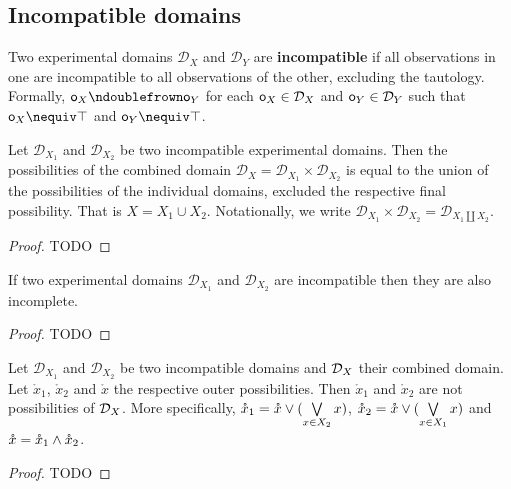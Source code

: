 \documentclass[11pt,letterpaper,fleqn]{memoir} %
\begin{document}
\subsection{Incompatible domains}

\begin{mathSection}
	\begin{defn}
		Two experimental domains $\mathcal{D}_X$ and $\mathcal{D}_Y$ are \textbf{incompatible} if all observations in one are incompatible to all observations of the other, excluding the tautology. Formally, $\obs_X \ncomp \obs_Y$ for each $\mathsf{o}_X \in \mathcal{D}_X$ and $\mathsf{o}_Y \in \mathcal{D}_Y$ such that $\obs_X \nequiv \tautology $ and $\obs_Y \nequiv \tautology$.
	\end{defn}
	\begin{prop}
		Let $\mathcal{D}_{X_1}$ and $\mathcal{D}_{X_2}$ be two incompatible experimental domains. Then the possibilities of the combined domain $\mathcal{D}_X = \mathcal{D}_{X_1} \times \mathcal{D}_{X_2}$ is equal to the union of the possibilities of the individual domains, excluded the respective final possibility. That is $X = X_1 \cup X_2$. Notationally, we write $\mathcal{D}_{X_1} \times \mathcal{D}_{X_2} = \mathcal{D}_{X_1 \coprod X_2}$.
	\end{prop}
	\begin{proof}
		TODO
	\end{proof}
	\begin{prop}
		If two experimental domains $\mathcal{D}_{X_1}$ and $\mathcal{D}_{X_2}$ are incompatible then they are also incomplete.
	\end{prop}
	\begin{proof}
		TODO
	\end{proof}
	\begin{prop}
		Let $\mathcal{D}_{X_1}$ and $\mathcal{D}_{X_2}$ be two incompatible domains and $\mathcal{D}_{X}$ their combined domain. Let $\mathring{x}_1$, $\mathring{x}_2$ and $\mathring{x}$ the respective outer possibilities. Then $\mathring{x}_1$ and $\mathring{x}_2$ are not possibilities of $\mathcal{D}_{X}$. More specifically, $\mathring{x}_1 = \mathring{x} \vee ( \bigvee\limits_{x \in X_2} x )$, $\mathring{x}_2 = \mathring{x} \vee ( \bigvee\limits_{x \in X_1} x )$ and $\mathring{x} = \mathring{x}_1 \wedge \mathring{x}_2$.
	\end{prop}
	\begin{proof}
		TODO
	\end{proof}
\end{mathSection}
\end{document}
